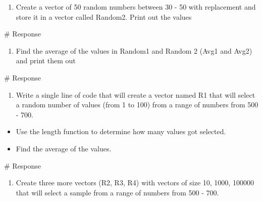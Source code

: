 \documentclass[
  letterpaper,
  DIV=11,
  numbers=noendperiod]{scrreprt}
\newenvironment{Shaded}{\begin{snugshade}}{\end{snugshade}}
\newcommand{\CommentTok}[1]{\textcolor[rgb]{0.37,0.37,0.37}{#1}}
\providecommand{\tightlist}{%
  \setlength{\itemsep}{0pt}\setlength{\parskip}{0pt}}\usepackage{longtable,booktabs,array}
\begin{document}
\begin{enumerate}
\def\labelenumi{\arabic{enumi}.}
\setcounter{enumi}{8}
\tightlist
\item
  Create a vector of 50 random numbers between 30 - 50 with replacement
  and store it in a vector called Random2. Print out the values
\end{enumerate}

\begin{Shaded}
\begin{Highlighting}[]
\CommentTok{\# Response}
\end{Highlighting}
\end{Shaded}

\begin{enumerate}
\def\labelenumi{\arabic{enumi}.}
\setcounter{enumi}{9}
\tightlist
\item
  Find the average of the values in Random1 and Random 2 (Avg1 and Avg2)
  and print them out
\end{enumerate}

\begin{Shaded}
\begin{Highlighting}[]
\CommentTok{\# Response}
\end{Highlighting}
\end{Shaded}

\begin{enumerate}
\def\labelenumi{\arabic{enumi}.}
\setcounter{enumi}{10}
\tightlist
\item
  Write a single line of code that will create a vector named R1 that
  will select a random number of values (from 1 to 100) from a range of
  numbers from 500 - 700.
\end{enumerate}

\begin{itemize}
\tightlist
\item
  Use the length function to determine how many values got selected.
\item
  Find the average of the values.
\end{itemize}

\begin{Shaded}
\begin{Highlighting}[]
\CommentTok{\# Response}
\end{Highlighting}
\end{Shaded}

\begin{enumerate}
\def\labelenumi{\arabic{enumi}.}
\setcounter{enumi}{11}
\tightlist
\item
  Create three more vectors (R2, R3, R4) with vectors of size 10, 1000,
  100000 that will select a sample from a range of numbers from 500 -
  700.
\end{enumerate}
\end{document}
